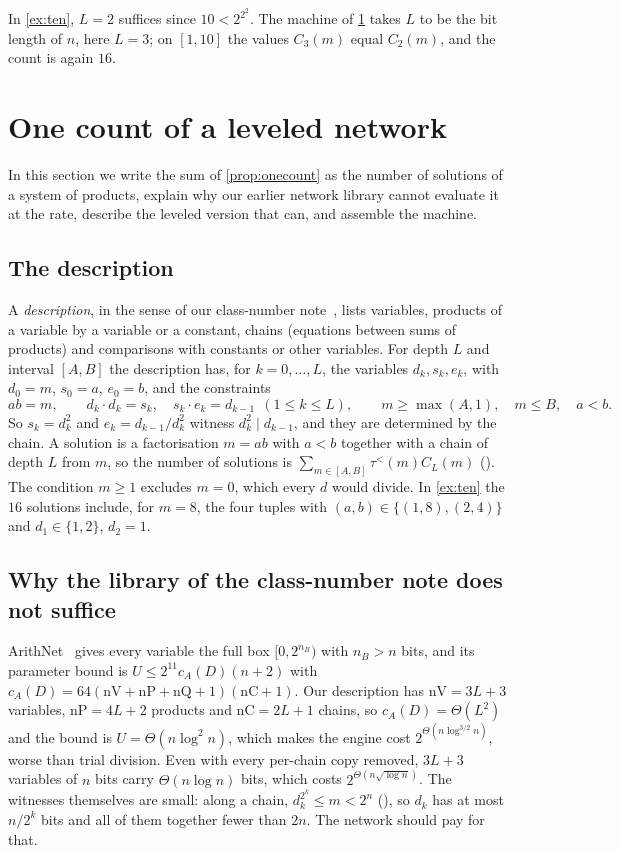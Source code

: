 \documentclass[10pt]{amsart}
\theoremstyle{plain}
\theoremstyle{definition}
\theoremstyle{remark}
\numberwithin{equation}{section}
\newcommand{\tl}{\tau^{<}}
\begin{document}
\noindent In \cref{ex:ten}, $L=2$ suffices since $10<2^{2^2}$. The machine of \cref{sec:network} takes
$L$ to be the bit length of $n$, here $L=3$; on $[1,10]$ the values $C_3(m)$ equal $C_2(m)$, and the
count is again $16$.

\section{One count of a leveled network}\label{sec:network}

In this section we write the sum of \cref{prop:onecount} as the number of solutions of a system of
products, explain why our earlier network library cannot evaluate it at the rate, describe the leveled
version that can, and assemble the machine.

\subsection{The description}
A \emph{description}, in the sense of our class-number note~\cite[\S3]{TulCN26}, lists variables,
products of a variable by a variable or a constant, chains (equations between sums of products) and
comparisons with constants or other variables. For depth $L$ and interval $[A,B]$ the description
 has, for $k=0,\dots,L$, the variables $d_k,s_k,e_k$, with $d_0=m$, $s_0=a$, $e_0=b$,
and the constraints
\[
  ab=m,\qquad d_k\cdot d_k=s_k,\quad s_k\cdot e_k=d_{k-1}\ \ (1\le k\le L),\qquad
  m\ge\max(A,1),\quad m\le B,\quad a<b .
\]
So $s_k=d_k^2$ and $e_k=d_{k-1}/d_k^2$ witness $d_k^2\mid d_{k-1}$, and they are determined by the
chain. A solution is a factorisation $m=ab$ with $a<b$ together with a chain of depth $L$ from $m$, so
the number of solutions is $\sum_{m\in[A,B]}\tl(m)C_L(m)$ (). The condition
$m\ge1$ excludes $m=0$, which every $d$ would divide. In \cref{ex:ten} the $16$ solutions include, for
$m=8$, the four tuples with $(a,b)\in\{(1,8),(2,4)\}$ and $d_1\in\{1,2\}$, $d_2=1$.

\subsection{Why the library of the class-number note does not suffice}
ArithNet~\cite{TulCN26} gives every variable the full box $[0,2^{n_B})$ with $n_B>n$ bits, and its
parameter bound is $U\le2^{11}c_A(D)(n+2)$ with $c_A(D)=64(\mathrm{nV}+\mathrm{nP}+\mathrm{nQ}+1)(\mathrm{nC}+1)$.
Our description has $\mathrm{nV}=3L+3$ variables, $\mathrm{nP}=4L+2$ products and $\mathrm{nC}=2L+1$
chains, so $c_A(D)=\Theta(L^2)$ and the bound is $U=\Theta(n\log^2n)$, which makes the engine cost
$2^{\Theta(n\log^{3/2}n)}$, worse than trial division. Even with every per-chain copy removed, $3L+3$
variables of $n$ bits carry $\Theta(n\log n)$ bits, which costs $2^{\Theta(n\sqrt{\log n})}$. The
witnesses themselves are small: along a chain, $d_k^{2^k}\le m<2^n$ (), so $d_k$ has at
most $n/2^k$ bits and all of them together fewer than $2n$. The network should pay for that.
\end{document}
